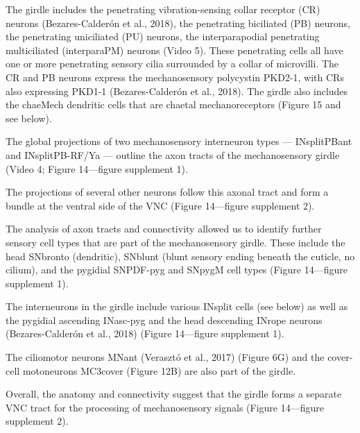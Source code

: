 \documentclass[
  11pt,
]{article}
\begin{document}
The girdle includes the penetrating vibration-sensing collar receptor
(CR) neurons (Bezares-Calderón et al., 2018), the penetrating biciliated
(PB) neurons, the penetrating uniciliated (PU) neurons, the
interparapodial penetrating multiciliated (interparaPM) neurons (Video
5). These penetrating cells all have one or more penetrating sensory
cilia surrounded by a collar of microvilli. The CR and PB neurons
express the mechanosensory polycystin PKD2-1, with CRs also expressing
PKD1-1 (Bezares-Calderón et al., 2018). The girdle also includes the
chaeMech dendritic cells that are chaetal mechanoreceptors (Figure 15
and see below).

The global projections of two mechanosensory interneuron types ---
INsplitPBant and INsplitPB-RF/Ya --- outline the axon tracts of the
mechanosensory girdle (Video 4; Figure 14---figure supplement 1).

The projections of several other neurons follow this axonal tract and
form a bundle at the ventral side of the VNC (Figure 14---figure
supplement 2).

The analysis of axon tracts and connectivity allowed us to identify
further sensory cell types that are part of the mechanosensory girdle.
These include the head SNbronto (dendritic), SNblunt (blunt sensory
ending beneath the cuticle, no cilium), and the pygidial SNPDF-pyg and
SNpygM cell types (Figure 14---figure supplement 1).

The interneurons in the girdle include various INsplit cells (see below)
as well as the pygidial ascending INasc-pyg and the head descending
INrope neurons (Bezares-Calderón et al., 2018) (Figure 14---figure
supplement 1).

The ciliomotor neurons MNant (Verasztó et al., 2017) (Figure 6G) and the
cover-cell motoneurons MC3cover (Figure 12B) are also part of the
girdle.

Overall, the anatomy and connectivity suggest that the girdle forms a
separate VNC tract for the processing of mechanosensory signals (Figure
14---figure supplement 2).
\end{document}
